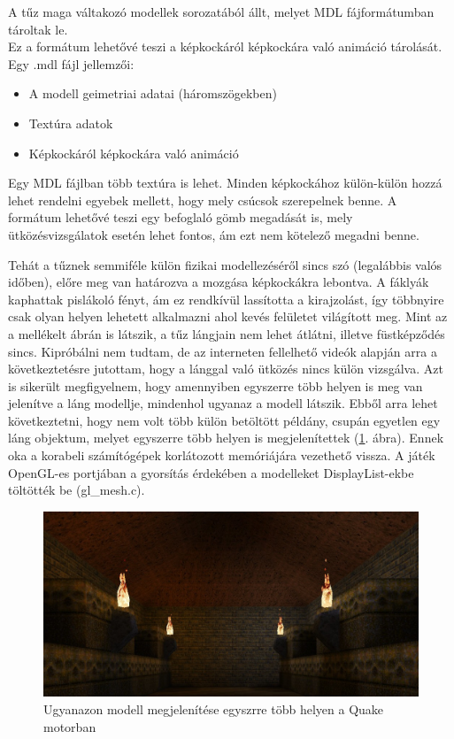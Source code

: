 A tűz maga váltakozó modellek sorozatából állt, melyet MDL fájformátumban tároltak le.\\
 Ez a formátum lehetővé teszi a képkockáról képkockára való animáció tárolását. Egy .mdl fájl jellemzői: 
\begin{itemize} 
\item A modell geimetriai adatai (háromszögekben)
\item Textúra adatok
\item Képkockáról képkockára való animáció
\end{itemize} 
Egy MDL fájlban több textúra is lehet. Minden képkockához külön-külön hozzá lehet rendelni egyebek mellett, hogy mely csúcsok szerepelnek benne. A formátum lehetővé teszi egy befoglaló gömb megadását is, mely ütközésvizsgálatok esetén lehet fontos, ám ezt nem kötelező megadni benne.  \cite{MDLformat} 
 
Tehát a tűznek semmiféle külön fizikai modellezéséről sincs szó (legalábbis valós időben), előre meg van határozva a mozgása képkockákra lebontva. A fáklyák kaphattak pislákoló fényt, ám ez rendkívül lassította a kirajzolást, így többnyire csak olyan helyen lehetett alkalmazni ahol kevés felületet világított meg. Mint az a mellékelt ábrán is látszik, a tűz lángjain nem lehet átlátni, illetve füstképződés sincs. Kipróbálni nem tudtam, de az interneten fellelhető videók alapján arra a következtetésre jutottam, hogy a lánggal való ütközés nincs külön vizsgálva. Azt is sikerült megfigyelnem, hogy amennyiben egyszerre több helyen is meg van jelenítve a láng modellje, mindenhol ugyanaz a modell látszik. Ebből arra lehet következtetni, hogy nem volt több külön betöltött példány, csupán egyetlen egy láng objektum, melyet egyszerre több helyen is megjelenítettek (\ref{fig:quakeTorch}. ábra). Ennek oka a korabeli számítógépek korlátozott memóriájára vezethető vissza. A játék OpenGL-es portjában a gyorsítás érdekében a modelleket DisplayList-ekbe töltötték be (gl\_mesh.c).

\begin{figure}[h]
 \includegraphics[width=\textwidth]{kepek/quake_torches2.jpg}
 \caption{Ugyanazon modell megjelenítése egyszrre több helyen a Quake motorban}
 \label{fig:quakeTorch}
\end{figure}

